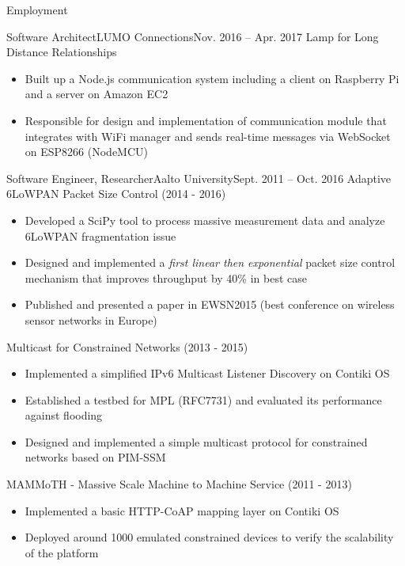 \documentclass[print]{mcdowellcv}
\begin{document}
	\makeheader
	
	\begin{cvsection}{Employment}
		\begin{cvsubsection}{Software Architect}{LUMO Connections}{Nov. 2016 -- Apr. 2017}
			Lamp for Long Distance Relationships
			\begin{itemize}
				\item Built up a Node.js communication system including a client on Raspberry Pi and a server on Amazon EC2
				\item Responsible for design and implementation of communication module that integrates with WiFi manager and 
				sends real-time messages via WebSocket on ESP8266 (NodeMCU)
			\end{itemize}
		\end{cvsubsection}
			
		\begin{cvsubsection}{Software Engineer, Researcher}{Aalto University}{Sept. 2011 -- Oct. 2016}
			Adaptive 6LoWPAN Packet Size Control (2014 - 2016)
			\begin{itemize}
				\item Developed a SciPy tool to process massive measurement data and analyze 6LoWPAN fragmentation issue
				\item Designed and implemented a \textit{first linear then exponential} packet size control mechanism that improves throughput by 40\% in best case
				\item Published and presented a paper in EWSN2015 (best conference on wireless sensor networks in Europe)
			\end{itemize}
			\smallskip
			Multicast for Constrained Networks (2013 - 2015)
			\begin{itemize}
				\item Implemented a simplified IPv6 Multicast Listener Discovery on Contiki OS
				\item Established a testbed for MPL (RFC7731) and evaluated its performance against flooding 
				\item Designed and implemented a simple multicast protocol for constrained networks based on PIM-SSM
			\end{itemize}
			\smallskip
			MAMMoTH - Massive Scale Machine to Machine Service (2011 - 2013)
			\begin{itemize}
				\item Implemented a basic HTTP-CoAP mapping layer on Contiki OS
				\item Deployed around 1000 emulated constrained devices to verify the scalability of the platform
			\end{itemize}
		\end{cvsubsection}


\end{cvsection}
\end{document}
